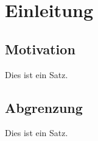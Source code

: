 \section{Einleitung}

\subsection{Motivation}

Dies ist ein Satz. 

\subsection{Abgrenzung}

Dies ist ein Satz.